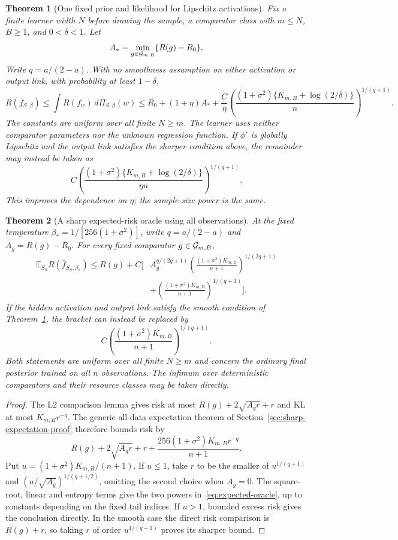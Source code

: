 \documentclass[11pt]{article}
\newtheorem{theorem}{Theorem}[section]\newtheorem{lemma}[theorem]{Lemma}
\theoremstyle{remark}\newtheorem{remark}[theorem]{Remark}
\newcommand{\E}{\mathbb E}\newcommand{\R}{\mathbb R}\newcommand{\Pp}{\mathbb P}
\begin{document}
\begin{theorem}[One fixed prior and likelihood for Lipschitz activations]
\label{thm:fast-oracle}
Fix a finite learner width $N$ before drawing the sample, a comparator class with $m\le N$, $B\ge1$, and $0<\delta<1$. Let
\[
 A_*=\min_{g\in\mathcal G_{m,B}}\{R(g)-R_0\}.
\]
Write $q=a/(2-a)$. With no smoothness assumption on either activation or output link, with probability at least $1-\delta$,
\begin{equation}
 R(\bar f_{S,\beta})
 \le \int R(f_w)\,d\Pi_{S,\beta}(w)
 \le R_0+(1+\eta)A_*
 +\frac C\eta\left(
 \frac{(1+\sigma^2)\{K_{m,B}+\log(2/\delta)\}}n
 \right)^{1/(q+1)}.
 \label{eq:main-oracle}
\end{equation}
The constants are uniform over all finite $N\ge m$. The learner uses neither comparator parameters nor the unknown regression function.
If $\phi'$ is globally Lipschitz and the output link satisfies the sharper condition above, the remainder may instead be taken as
\[
 C\left(\frac{(1+\sigma^2)\{K_{m,B}+\log(2/\delta)\}}{\eta n}
 \right)^{1/(q+1)}.
\]
This improves the dependence on $\eta$; the sample-size power is the same.
\end{theorem}

\begin{theorem}[A sharp expected-risk oracle using all observations]
\label{thm:expected-oracle}
At the fixed temperature $\beta_*=1/[256(1+\sigma^2)]$, write
$q=a/(2-a)$ and $A_g=R(g)-R_0$. For every fixed comparator $g\in\mathcal G_{m,B}$,
\begin{align}
 \E_{S_n}R(\bar f_{S_n,\beta_*})
 \le R(g)+C\bigg[
 &A_g^{q/(2q+1)}
 \left(\frac{(1+\sigma^2)K_{m,B}}{n+1}\right)^{1/(2q+1)}
 \nonumber\\
 &+\left(\frac{(1+\sigma^2)K_{m,B}}{n+1}\right)^{1/(q+1)}
 \bigg].
 \label{eq:expected-oracle}
\end{align}
If the hidden activation and output link satisfy the smooth condition of Theorem~\ref{thm:fast-oracle}, the bracket can instead be replaced by
\[
 C\left(\frac{(1+\sigma^2)K_{m,B}}{n+1}\right)^{1/(q+1)}.
\]
Both statements are uniform over all finite $N\ge m$ and concern the ordinary final posterior trained on all $n$ observations. The infimum over deterministic comparators and their resource classes may be taken directly.
\end{theorem}
\begin{proof}
The L2 comparison lemma gives risk at most
$R(g)+2\sqrt{A_g r}+r$ and KL at most $K_{m,B}r^{-q}$.
The generic all-data expectation theorem of Section~\ref{sec:sharp-expectation-proof} therefore bounds risk by
\[
 R(g)+2\sqrt{A_g r}+r+\frac{256(1+\sigma^2)K_{m,B}r^{-q}}{n+1}.
\]
Put $u=(1+\sigma^2)K_{m,B}/(n+1)$. If $u\le1$, take $r$ to be the smaller of $u^{1/(q+1)}$ and $(u/\sqrt{A_g})^{1/(q+1/2)}$, omitting the second choice when $A_g=0$. The square-root, linear and entropy terms give the two powers in~\eqref{eq:expected-oracle}, up to constants depending on the fixed tail indices. If $u>1$, bounded excess risk gives the conclusion directly. In the smooth case the direct risk comparison is $R(g)+r$, so taking $r$ of order $u^{1/(q+1)}$ proves its sharper bound.
\end{proof}
\end{document}
